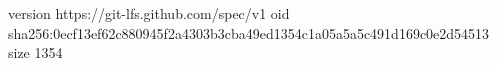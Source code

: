 version https://git-lfs.github.com/spec/v1
oid sha256:0ecf13ef62c880945f2a4303b3cba49ed1354c1a05a5a5c491d169c0e2d54513
size 1354
